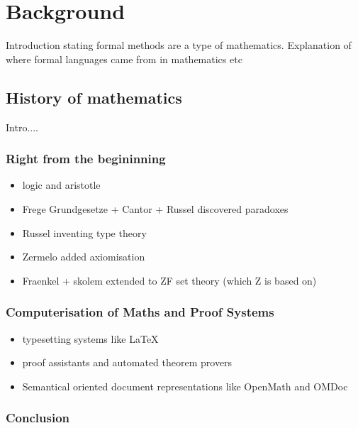 \chapter{Background}
\label{ch:background}

Introduction stating formal methods are a type of mathematics. Explanation of where formal languages came from in mathematics etc

\section{History of mathematics}

Intro....

\subsection{Right from the begininning}

\begin{itemize}
\item logic and aristotle

\item Frege Grundgesetze + Cantor + Russel discovered paradoxes

\item Russel inventing type theory

\item Zermelo added axiomisation

\item Fraenkel + skolem extended to ZF set theory (which Z is based on)

\end{itemize}

\subsection{Computerisation of Maths and Proof Systems}

\begin{itemize}
\item typesetting systems like \LaTeX{}

\item proof assistants and automated theorem provers

\item Semantical oriented document representations like OpenMath and OMDoc
\end{itemize}


\subsection{Conclusion}

